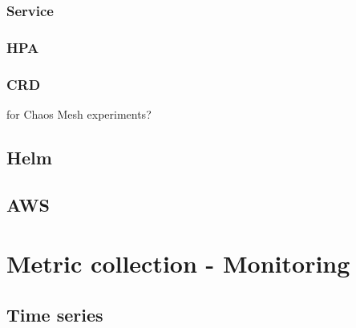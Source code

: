 \subsubsection{Service} \label{k8s-service}

\subsubsection{HPA}

\subsubsection{CRD}

for Chaos Mesh experiments?

\subsection{Helm}

\subsection{AWS}


\section{Metric collection - Monitoring}

\subsection{Time series}


